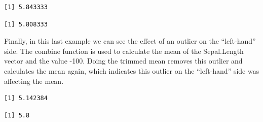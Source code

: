 \documentclass[
  letterpaper,
  DIV=11,
  numbers=noendperiod]{scrreprt}
\newenvironment{Shaded}{\begin{snugshade}}{\end{snugshade}}
\newcommand{\AttributeTok}[1]{\textcolor[rgb]{0.40,0.45,0.13}{#1}}
\newcommand{\DecValTok}[1]{\textcolor[rgb]{0.68,0.00,0.00}{#1}}
\newcommand{\FunctionTok}[1]{\textcolor[rgb]{0.28,0.35,0.67}{#1}}
\newcommand{\NormalTok}[1]{\textcolor[rgb]{0.00,0.23,0.31}{#1}}
\newcommand{\SpecialCharTok}[1]{\textcolor[rgb]{0.37,0.37,0.37}{#1}}
\begin{document}
\begin{Shaded}
\end{Shaded}

\begin{verbatim}
[1] 5.843333
\end{verbatim}

\begin{Shaded}
\end{Shaded}

\begin{verbatim}
[1] 5.808333
\end{verbatim}

Finally, in this last example we can see the effect of an outlier on the
``left-hand'' side. The combine function is used to calculate the mean
of the Sepal.Length vector and the value -100. Doing the trimmed mean
removes this outlier and calculates the mean again, which indicates this
outlier on the ``left-hand'' side was affecting the mean.

\begin{Shaded}
\end{Shaded}

\begin{verbatim}
[1] 5.142384
\end{verbatim}

\begin{Shaded}
\end{Shaded}

\begin{verbatim}
[1] 5.8
\end{verbatim}
\end{document}
